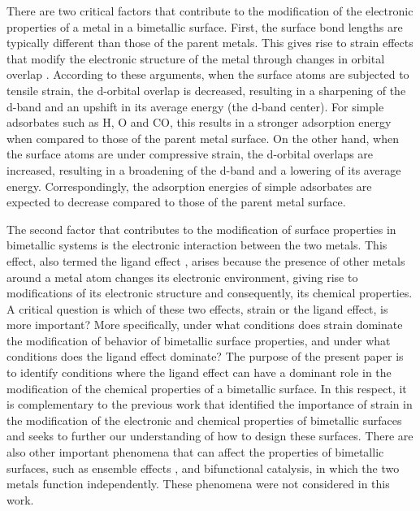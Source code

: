 \documentclass[aps,preprint,superscriptaddress,endfloats*]{revtex4}
\begin{document}
There are two critical factors that contribute to the modification of
the electronic properties of a metal in a bimetallic surface.  First,
the surface bond lengths are typically different than those of the
parent metals.  This gives rise to strain effects that modify the
electronic structure of the metal through changes in orbital overlap
\cite{mavrikakis1998:_effec_strain_metal}.  According to these
arguments, when the surface atoms are subjected to tensile strain, the
d-orbital overlap is decreased, resulting in a sharpening of the
d-band and an upshift in its average energy (the d-band center).  For
simple adsorbates such as H, O and CO, this results in a stronger
adsorption energy when compared to those of the parent metal surface.
On the other hand, when the surface atoms are under compressive
strain, the d-orbital overlaps are increased, resulting in a
broadening of the d-band and a lowering of its average energy.
Correspondingly, the adsorption energies of simple adsorbates are
expected to decrease compared to those of the parent metal surface.

The second factor that contributes to the modification of surface
properties in bimetallic systems is the electronic interaction between
the two metals.  This effect, also termed the ligand effect
\cite{liu2001:_ligan,gauthier2001:_adsor_co}, arises because the
presence of other metals around a metal atom changes its electronic
environment, giving rise to modifications of its electronic structure
and consequently, its chemical properties.  A critical question is
which of these two effects, strain or the ligand effect, is more
important?  More specifically, under what conditions does strain
dominate the modification of behavior of bimetallic surface
properties, and under what conditions does the ligand effect dominate?
The purpose of the present paper is to identify conditions where the
ligand effect can have a dominant role in the modification of the
chemical properties of a bimetallic surface.  In this respect, it is
complementary to the previous work that identified the importance of
strain in the modification of the electronic and chemical properties
of bimetallic surfaces \cite{mavrikakis1998:_effec_strain_metal} and
seeks to further our understanding of how to design these surfaces.
There are also other important phenomena that can affect the
properties of bimetallic surfaces, such as ensemble effects
\cite{liu2001:_ligan}, and bifunctional catalysis, in which the two
metals function independently. These phenomena were not considered in
this work.
 
\end{document}
